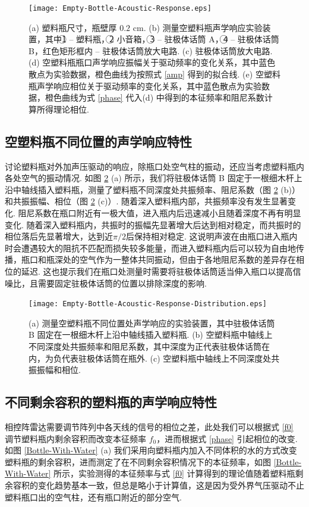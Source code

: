 \documentclass[a4paper, 10pt]{article}
\begin{document}
\begin{figure}[h]
    \centering
    \texttt{[image: Empty-Bottle-Acoustic-Response.eps]}
    \caption{(a) 塑料瓶尺寸，瓶壁厚 $0.2$ cm. (b) 测量空塑料瓶声学响应实验装置，其中\textcircled{1} -- 塑料瓶，\textcircled{2} 小音箱，\textcircled{3} -- 驻极体话筒 A，\textcircled{4} -- 驻极体话筒 B，红色矩形框内 -- 驻极体话筒放大电路. (c) 驻极体话筒放大电路. (d) 空塑料瓶瓶口声学响应振幅关于驱动频率的变化关系，其中蓝色散点为实验数据，橙色曲线为按照式 \eqref{amp} 得到的拟合线. (e) 空塑料瓶声学响应相位关于驱动频率的变化关系，其中蓝色散点为实验数据，橙色曲线为式 \eqref{phase} 代入(d) 中得到的本征频率和阻尼系数计算所得理论相位.}
    \label{Empty-Bottle-Acoustic-Response}
\end{figure}

\subsection{空塑料瓶不同位置的声学响应特性}
讨论塑料瓶对外加声压驱动的响应，除瓶口处空气柱的振动，还应当考虑塑料瓶内各处空气的振动情况. 如图 \ref{Empty-Bottle-Acoustic-Response-Distribution} (a) 所示，我们将驻极体话筒 B 固定于一根细木杆上沿中轴线插入塑料瓶，测量了塑料瓶不同深度处共振频率、阻尼系数（图 \ref{Empty-Bottle-Acoustic-Response-Distribution} (b)）和共振振幅、相位（图 \ref{Empty-Bottle-Acoustic-Response-Distribution} (c)）. 随着深入塑料瓶内部，共振频率没有发生显著变化. 阻尼系数在瓶口附近有一极大值，进入瓶内后迅速减小且随着深度不再有明显变化. 随着深入塑料瓶内，共振时的振幅先显著增大后达到相对稳定，而共振时的相位落后先显著增大，达到近$\pi/2$后保持相对稳定. 这说明声波在由瓶口进入瓶内时会遭遇较大的阻抗不匹配而损失较多能量，而进入塑料瓶内后可以较为自由地传播，瓶口和瓶深处的空气作为一整体共同振动，但由于各地阻尼系数的差异存在相位的延迟. 这也提示我们在瓶口处测量时需要将驻极体话筒适当伸入瓶口以提高信噪比，且需要固定驻极体话筒的位置以排除深度的影响.

\begin{figure}[h]
    \centering
    \texttt{[image: Empty-Bottle-Acoustic-Response-Distribution.eps]}
    \caption{(a) 测量空塑料瓶不同位置处声学响应的实验装置，其中驻极体话筒 B 固定在一根细木杆上沿中轴线插入塑料瓶. (b) 空塑料瓶中轴线上不同深度处共振频率和阻尼系数，其中深度为正代表驻极体话筒在内，为负代表驻极体话筒在瓶外. (c) 空塑料瓶中轴线上不同深度处共振振幅和相位.}
    \label{Empty-Bottle-Acoustic-Response-Distribution}
\end{figure}

\subsection{不同剩余容积的塑料瓶的声学响应特性}
相控阵雷达需要调节阵列中各天线的信号的相位之差，此处我们可以根据式 \eqref{f0} 调节塑料瓶内剩余容积而改变本征频率 $f_0$，进而根据式 \eqref{phase} 引起相位的改变. 如图 \ref{Bottle-With-Water} (a) 我们采用向塑料瓶内加入不同体积的水的方式改变塑料瓶的剩余容积，进而测定了在不同剩余容积情况下的本征频率，如图 \ref{Bottle-With-Water} 所示，实验测得的本征频率与式 \eqref{f0} 计算得到的理论值随着塑料瓶剩余容积的变化趋势基本一致，但总是略小于计算值，这是因为受外界气压驱动不止塑料瓶口出的空气柱，还有瓶口附近的部分空气.
\end{document}
